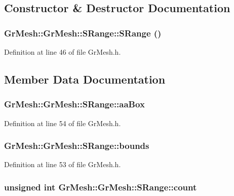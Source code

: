 \subsection{Constructor \& Destructor Documentation}
\hypertarget{struct_gr_mesh_1_1_s_range_9b2b1d5ee9adae30d34994240453dfb2}{
\subsubsection[{SRange}]{\setlength{\rightskip}{0pt plus 5cm}GrMesh::GrMesh::SRange::SRange ()}}
\label{struct_gr_mesh_1_1_s_range_9b2b1d5ee9adae30d34994240453dfb2}




Definition at line 46 of file GrMesh.h.

\subsection{Member Data Documentation}
\hypertarget{struct_gr_mesh_1_1_s_range_6f515e5181e2803d43e7e2bc36bdb430}{
\subsubsection[{aaBox}]{ GrMesh::GrMesh::SRange::aaBox}}
\label{struct_gr_mesh_1_1_s_range_6f515e5181e2803d43e7e2bc36bdb430}




Definition at line 54 of file GrMesh.h.\hypertarget{struct_gr_mesh_1_1_s_range_7c2fe272192a5165a0f3c6b854ba83d1}{
\subsubsection[{bounds}]{ GrMesh::GrMesh::SRange::bounds}}
\label{struct_gr_mesh_1_1_s_range_7c2fe272192a5165a0f3c6b854ba83d1}




Definition at line 53 of file GrMesh.h.\hypertarget{struct_gr_mesh_1_1_s_range_6431490fa0589e30eb3eef84b21352c5}{
\subsubsection[{count}]{\setlength{\rightskip}{0pt plus 5cm}unsigned int {\bf GrMesh::GrMesh::SRange::count}}}
\label{struct_gr_mesh_1_1_s_range_6431490fa0589e30eb3eef84b21352c5}




